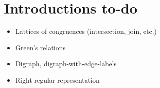\section{Introductions to-do}
\begin{itemize}
\item Lattices of congruences (intersection, join, etc.)
\item Green's relations
\item Digraph, digraph-with-edge-labels
\item Right regular representation
\end{itemize}

